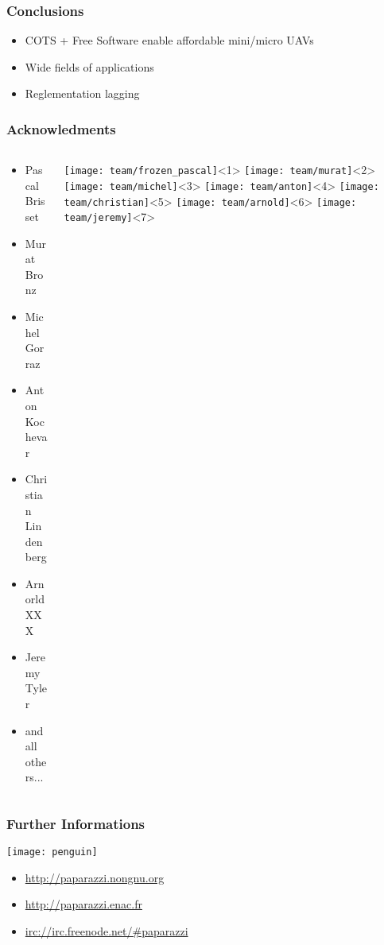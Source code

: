 
\begin{frame}
  \frametitle{Conclusions}
    \begin{itemize}
      \item<1-> COTS + Free Software enable affordable mini/micro UAVs
      \item<2-> Wide fields of applications
      \item<3-> Reglementation lagging
    \end{itemize}
\end{frame}

\begin{frame}
  \frametitle{Acknowledments}
  \begin{columns}
    \begin{column}{5cm}
	\begin{itemize}
	  \item<1-> Pascal Brisset
	  \item<2-> Murat Bronz
	  \item<3-> Michel Gorraz
	  \item<4-> Anton Kochevar
	  \item<5-> Christian Lindenberg
	  \item<6-> Arnorld XXX
	  \item<7-> Jeremy Tyler
	  \item<7-> and all others...
        \end{itemize}
    \end{column}

    \begin{column}{5cm}
      \begin{center}
        \texttt{[image: team/frozen\_pascal]}<1>
        \texttt{[image: team/murat]}<2>
        \texttt{[image: team/michel]}<3>
        \texttt{[image: team/anton]}<4>
        \texttt{[image: team/christian]}<5>
        \texttt{[image: team/arnold]}<6>
        \texttt{[image: team/jeremy]}<7>
      \end{center}
    \end{column}
  \end{columns}
\end{frame}


\begin{frame}
  \frametitle{Further Informations}

  \texttt{[image: penguin]}

    \begin{itemize}
      \item \url{http://paparazzi.nongnu.org}
      \item \url{http://paparazzi.enac.fr}
      \item \url{irc://irc.freenode.net/#paparazzi}
    \end{itemize}

\end{frame}

